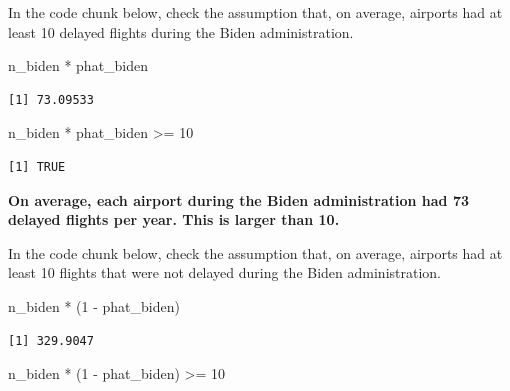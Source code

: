 \documentclass[
  letterpaper,
  DIV=11,
  numbers=noendperiod]{scrartcl}
\newenvironment{Shaded}{\begin{snugshade}}{\end{snugshade}}
\newcommand{\DecValTok}[1]{\textcolor[rgb]{0.68,0.00,0.00}{#1}}
\newcommand{\NormalTok}[1]{\textcolor[rgb]{0.00,0.23,0.31}{#1}}
\newcommand{\SpecialCharTok}[1]{\textcolor[rgb]{0.37,0.37,0.37}{#1}}
\begin{document}
In the code chunk below, check the assumption that, on average, airports
had at least 10 delayed flights during the Biden administration.

\begin{Shaded}
\begin{Highlighting}[]
\NormalTok{n\_biden }\SpecialCharTok{*}\NormalTok{ phat\_biden}
\end{Highlighting}
\end{Shaded}

\begin{verbatim}
[1] 73.09533
\end{verbatim}

\begin{Shaded}
\begin{Highlighting}[]
\NormalTok{n\_biden }\SpecialCharTok{*}\NormalTok{ phat\_biden }\SpecialCharTok{\textgreater{}=} \DecValTok{10}
\end{Highlighting}
\end{Shaded}

\begin{verbatim}
[1] TRUE
\end{verbatim}

\begin{tcolorbox}[enhanced jigsaw, colback=white, breakable, arc=.35mm, left=2mm, colframe=quarto-callout-warning-color-frame, opacityback=0, rightrule=.15mm, toprule=.15mm, bottomrule=.15mm, leftrule=.75mm]

\textbf{On average, each airport during the Biden administration had 73
delayed flights per year. This is larger than 10.}

\end{tcolorbox}

In the code chunk below, check the assumption that, on average, airports
had at least 10 flights that were not delayed during the Biden
administration.

\begin{Shaded}
\begin{Highlighting}[]
\NormalTok{n\_biden }\SpecialCharTok{*}\NormalTok{ (}\DecValTok{1} \SpecialCharTok{{-}}\NormalTok{ phat\_biden)}
\end{Highlighting}
\end{Shaded}

\begin{verbatim}
[1] 329.9047
\end{verbatim}

\begin{Shaded}
\begin{Highlighting}[]
\NormalTok{n\_biden }\SpecialCharTok{*}\NormalTok{ (}\DecValTok{1} \SpecialCharTok{{-}}\NormalTok{ phat\_biden) }\SpecialCharTok{\textgreater{}=} \DecValTok{10}
\end{Highlighting}
\end{Shaded}
\end{document}
